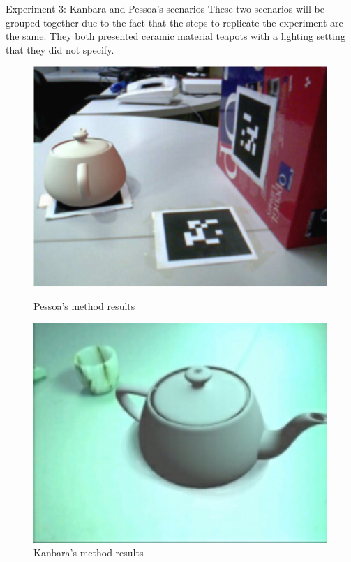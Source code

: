 Experiment 3: Kanbara and Pessoa's scenarios\newline  
These two scenarios will be grouped together due to the fact that the steps to replicate the experiment are the same. They both presented ceramic material teapots with a lighting setting that they did not specify. 
\begin{figure}[H]
    \centering
    \begin{minipage}{0.475\textwidth}
        \centering
        \includegraphics[width=0.99\textwidth]{Figures/Pessoa.png} %
        \caption{Pessoa's method results}
    \end{minipage}\hfill
    \begin{minipage}{0.475\textwidth}
        \centering
        \includegraphics[width=0.99\textwidth]{Figures/kanbara.png} %
        \caption{Kanbara's method results}
    \end{minipage}\hfill
\end{figure}

